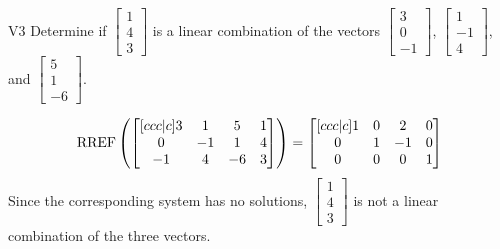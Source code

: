 \begin{problem}{V3} 
Determine if \(\begin{bmatrix} 1 \\ 4 \\ 3 \end{bmatrix}\) is a linear combination of the vectors \(\begin{bmatrix} 3 \\ 0 \\ -1 \end{bmatrix}\), \(\begin{bmatrix} 1 \\ -1 \\ 4 \end{bmatrix}\), and \(\begin{bmatrix} 5 \\ 1 \\  -6 \end{bmatrix}\).
\end{problem}
\begin{solution}
\[\operatorname{RREF}\left(\begin{bmatrix}[ccc|c] 3 & 1 & 5 & 1 \\ 0 & -1 & 1 & 4 \\ -1 & 4 & -6 & 3 \end{bmatrix} \right) = \begin{bmatrix}[ccc|c] 1 & 0 & 2 & 0 \\ 0 & 1 & -1 & 0 \\ 0 & 0 & 0 & 1 \end{bmatrix}\]
Since the corresponding system has no solutions, \(\begin{bmatrix} 1 \\ 4 \\ 3 \end{bmatrix}\) is not a linear combination of the three vectors.
\end{solution}


